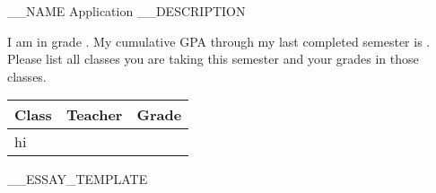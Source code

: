 \LARGE{__NAME Application}
__DESCRIPTION
\begin{questions}
  \question I am in grade \fillin.
  \question My cumulative GPA through my last completed semester is \fillin.
  \question Please list all classes you are taking this semester and your grades in those classes. \\
  \begin{tabularx}{.9\textwidth}{X|X|r}
    Class & Teacher & Grade \\ \hline
    \parbox[][2in]{0pt}{hi} & & \\
  \end{tabularx}
  __ESSAY_TEMPLATE
  
  \thispagestyle{empty} %
\end{questions}
\pagebreak